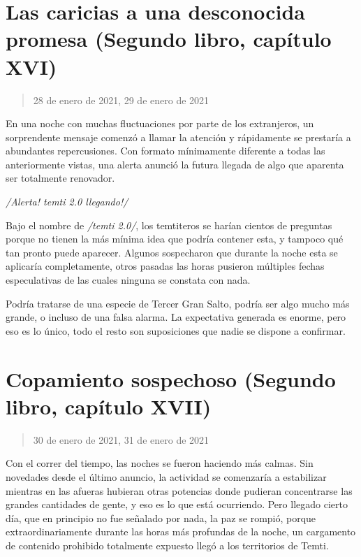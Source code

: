 \documentclass[
]{book}
\begin{document}
\hypertarget{las-caricias-a-una-desconocida-promesa-segundo-libro-capuxedtulo-xvi}{%
\section{Las caricias a una desconocida promesa (Segundo libro, capítulo XVI)}\label{las-caricias-a-una-desconocida-promesa-segundo-libro-capuxedtulo-xvi}}

\begin{quote}
28 de enero de 2021, 29 de enero de 2021
\end{quote}

En una noche con muchas fluctuaciones por parte de los extranjeros, un sorprendente mensaje comenzó a llamar la atención y rápidamente se prestaría a abundantes repercusiones. Con formato mínimamente diferente a todas las anteriormente vistas, una alerta anunció la futura llegada de algo que aparenta ser totalmente renovador.

\emph{/Alerta! temti 2.0 llegando!/}

Bajo el nombre de \emph{/temti 2.0/}, los temtiteros se harían cientos de preguntas porque no tienen la más mínima idea que podría contener esta, y tampoco qué tan pronto puede aparecer. Algunos sospecharon que durante la noche esta se aplicaría completamente, otros pasadas las horas pusieron múltiples fechas especulativas de las cuales ninguna se constata con nada.

Podría tratarse de una especie de Tercer Gran Salto, podría ser algo mucho más grande, o incluso de una falsa alarma. La expectativa generada es enorme, pero eso es lo único, todo el resto son suposiciones que nadie se dispone a confirmar.

\hypertarget{copamiento-sospechoso-segundo-libro-capuxedtulo-xvii}{%
\section{Copamiento sospechoso (Segundo libro, capítulo XVII)}\label{copamiento-sospechoso-segundo-libro-capuxedtulo-xvii}}

\begin{quote}
30 de enero de 2021, 31 de enero de 2021
\end{quote}

Con el correr del tiempo, las noches se fueron haciendo más calmas. Sin novedades desde el último anuncio, la actividad se comenzaría a estabilizar mientras en las afueras hubieran otras potencias donde pudieran concentrarse las grandes cantidades de gente, y eso es lo que está ocurriendo. Pero llegado cierto día, que en principio no fue señalado por nada, la paz se rompió, porque extraordinariamente durante las horas más profundas de la noche, un cargamento de contenido prohibido totalmente expuesto llegó a los territorios de Temti.
\end{document}
